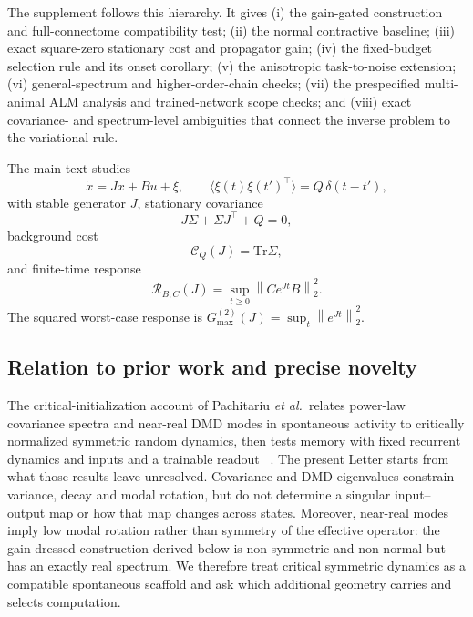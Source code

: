 \documentclass[
  aps,prl,preprint,notitlepage,superscriptaddress,nofootinbib,longbibliography,
  amsmath,amssymb
]{revtex4-2}
\newcommand{\Tr}{\mathrm{Tr}}
\newcommand{\Gmax}{G_{\max}^{(2)}}
\newcommand{\Rtask}{\mathcal{R}}
\newcommand{\Cnoise}{\mathcal{C}}
\newcommand{\opnorm}[1]{\left\lVert #1\right\rVert_2}
\begin{document}
The supplement follows this hierarchy.  It gives (i) the gain-gated
construction and full-connectome compatibility test; (ii) the normal
contractive baseline; (iii) exact square-zero stationary cost and propagator
gain; (iv) the fixed-budget selection rule and its onset corollary; (v) the
anisotropic task-to-noise extension; (vi) general-spectrum and higher-order-chain
checks; (vii) the prespecified multi-animal ALM analysis and trained-network
scope checks; and (viii) exact covariance- and spectrum-level ambiguities that
connect the inverse problem to the variational rule.

The main text studies
\begin{equation}
\dot x=Jx+Bu+\xi,\qquad
\langle\xi(t)\xi(t')^\top\rangle=Q\,\delta(t-t'),
\label{eq:s-dynamics}
\end{equation}
with stable generator $J$, stationary covariance
\begin{equation}
J\Sigma+\Sigma J^\top+Q=0,
\label{eq:s-lyapunov}
\end{equation}
background cost
\begin{equation}
\Cnoise_Q(J)=\Tr\Sigma,
\label{eq:s-cost}
\end{equation}
and finite-time response
\begin{equation}
\Rtask_{B,C}(J)=\sup_{t\ge0}\opnorm{Ce^{Jt}B}^2.
\label{eq:s-response}
\end{equation}
The squared worst-case response is
$\Gmax(J)=\sup_t\opnorm{e^{Jt}}^2$.

\subsection{Relation to prior work and precise novelty}

The critical-initialization account of Pachitariu \emph{et al.}\ relates
power-law covariance spectra and near-real DMD modes in spontaneous activity to
critically normalized symmetric random dynamics, then tests memory with fixed
recurrent dynamics and inputs and a trainable readout
~\cite{pachitariu2026critical}.  The present Letter starts from what those
results leave unresolved.  Covariance and DMD eigenvalues constrain variance,
decay and modal rotation, but do not determine a singular input--output map or
how that map changes across states.  Moreover, near-real modes imply low modal
rotation rather than symmetry of the effective operator: the gain-dressed
construction derived below is non-symmetric and non-normal but has an exactly
real spectrum.  We therefore treat critical symmetric dynamics
as a compatible spontaneous scaffold and ask which additional geometry carries
and selects computation.
\end{document}
